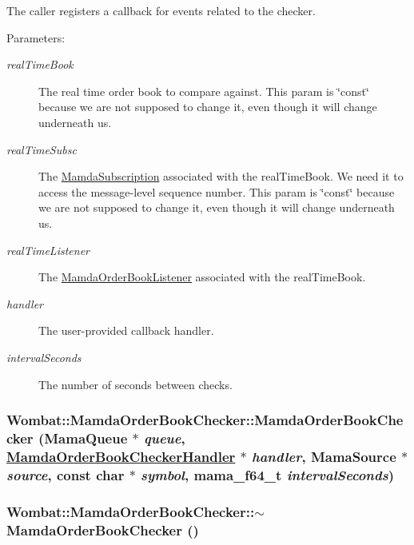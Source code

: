 The caller registers a callback for events related to the checker.

\begin{Desc}
\item[Parameters:]
\begin{description}
\item[{\em real\-Time\-Book}]The real time order book to compare against. This param is \char`\"{}const\char`\"{} because we are not supposed to change it, even though it will change underneath us.\item[{\em real\-Time\-Subsc}]The \hyperlink{classWombat_1_1MamdaSubscription}{Mamda\-Subscription} associated with the real\-Time\-Book. We need it to access the message-level sequence number. This param is \char`\"{}const\char`\"{} because we are not supposed to change it, even though it will change underneath us.\item[{\em real\-Time\-Listener}]The \hyperlink{classWombat_1_1MamdaOrderBookListener}{Mamda\-Order\-Book\-Listener} associated with the real\-Time\-Book.\item[{\em handler}]The user-provided callback handler.\item[{\em interval\-Seconds}]The number of seconds between checks. \end{description}
\end{Desc}
\hypertarget{classWombat_1_1MamdaOrderBookChecker_6e5a49015e8d82944d395d1c242fe32e}{
\subsubsection[MamdaOrderBookChecker]{\setlength{\rightskip}{0pt plus 5cm}Wombat::Mamda\-Order\-Book\-Checker::Mamda\-Order\-Book\-Checker (Mama\-Queue $\ast$ {\em queue}, \hyperlink{classWombat_1_1MamdaOrderBookCheckerHandler}{Mamda\-Order\-Book\-Checker\-Handler} $\ast$ {\em handler}, Mama\-Source $\ast$ {\em source}, const char $\ast$ {\em symbol}, mama\_\-f64\_\-t {\em interval\-Seconds})}}
\label{classWombat_1_1MamdaOrderBookChecker_6e5a49015e8d82944d395d1c242fe32e}


\hypertarget{classWombat_1_1MamdaOrderBookChecker_cc281bbb5f7fa277c30adbb773bfa3b2}{
\subsubsection[$\sim$MamdaOrderBookChecker]{\setlength{\rightskip}{0pt plus 5cm}Wombat::Mamda\-Order\-Book\-Checker::$\sim$Mamda\-Order\-Book\-Checker ()}}
\label{classWombat_1_1MamdaOrderBookChecker_cc281bbb5f7fa277c30adbb773bfa3b2}


